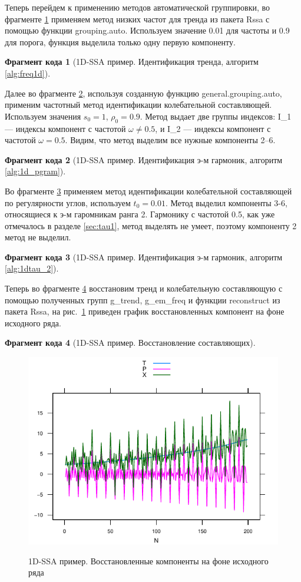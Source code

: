 \documentclass[specialist,
               substylefile = spbu.rtx,
               subf,href,colorlinks=true, 12pt]{disser}
\newtheorem{fragment}{Фрагмент кода}[section]
\newcommand{\bfgh}{\begin{figure}[!htbp]}
\newcommand{\efg}{\end{figure}}
\begin{document}
Теперь перейдем к применению методов автоматической группировки, во фрагменте \ref{frag:1dssa_trend} применяем метод низких частот для тренда из пакета Rssa с помощью функции grouping.auto. Используем значение 0.01 для частоты и 0.9 для порога, функция выделила только одну первую компоненту. 
\begin{fragment}[1D-SSA пример. Идентификация тренда, алгоритм \ref{alg:freq1d}]
\label{frag:1dssa_trend}

\end{fragment}
Далее во фрагменте \ref{frag:1dssa_em_freq}, используя созданную функцию general.grouping.auto, применим частотный метод идентификации колебательной составляющей. Используем значения $s_0 = 1$, $\rho_0 = 0.9$. 
Метод выдает две группы индексов: I\_1 --- индексы компонент с частотой $\omega \not = 0.5$, и I\_2 --- индексы компонент с частотой $\omega = 0.5$.
Видим, что метод выделим все нужные компоненты 2--6.
\begin{fragment}[1D-SSA пример. Идентификация э-м гармоник,  алгоритм \ref{alg:1d_pgram}]
\label{frag:1dssa_em_freq}

\end{fragment}
Во фрагменте \ref{frag:1dssa_em_tau} применяем метод идентификации колебательной составляющей по регулярности углов, используем $t_0 = 0.01$. Метод выделил компоненты 3-6, относящиеся к э-м гаромникам ранга 2. Гармонику с частотой 0.5, как уже отмечалось в разделе \ref{sec:tau1}, метод выделять не умеет, поэтому компоненту 2 метод не выделил. 
\begin{fragment}[1D-SSA пример. Идентификация э-м гармоник, алгоритм \ref{alg:1dtau_2}]
\label{frag:1dssa_em_tau}

\end{fragment}
Теперь во фрагменте \ref{frag:1dssa_rec} восстановим тренд и колебательную составляющую с помощью полученных групп g\_trend, g\_em\_freq и функции reconstruct из пакета Rssa, на рис.~\ref{fig:1dssa_rec} приведен график восстановленных компонент на фоне исходного ряда.
\begin{fragment}[1D-SSA пример. Восстановление составляющих]
\label{frag:1dssa_rec}

\end{fragment}
\bfgh
        \begin{center}
{\includegraphics[width=4.5in]{1dssa_rec}}
        \end{center}
        \caption{1D-SSA пример. Восстановленные компоненты на фоне исходного ряда}
        \label{fig:1dssa_rec}
\efg
\end{document}
